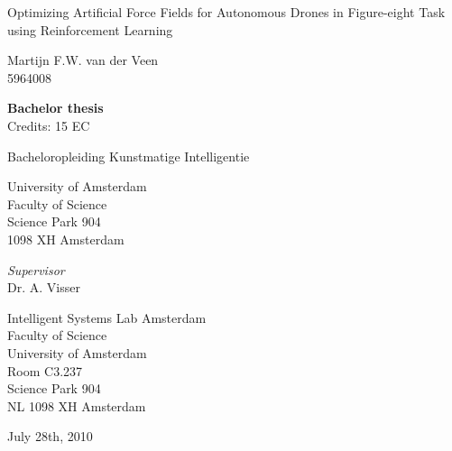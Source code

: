\documentclass[11pt]{article}
\begin{document}

\begin{titlepage}
\begin{center}

\vspace{2.5cm}

\begin{huge}
Optimizing Artificial Force Fields for Autonomous Drones in Figure-eight Task using Reinforcement Learning
\end{huge}

\vspace{1.5cm}
Martijn F.W. van der Veen\\
5964008

\vspace{1cm}
\textbf{Bachelor thesis}\\
Credits: 15 EC

\vspace{0.25cm}
Bacheloropleiding Kunstmatige Intelligentie

\vspace{0.25cm}
University of Amsterdam\\
Faculty of Science\\
Science Park 904\\
1098 XH Amsterdam

\vspace{2cm}
\emph{Supervisor}\\
Dr. A. Visser

\vspace{0.25cm}
Intelligent Systems Lab Amsterdam\\
Faculty of Science\\
University of Amsterdam\\
Room C3.237\\
Science Park 904\\
NL 1098 XH Amsterdam

\vspace{1.5cm}
July 28th, 2010

\end{center}
\end{titlepage}

\pagebreak



\pagestyle{empty} %
\begin{abstract}
\end{abstract}
\pagebreak

\end{document}
